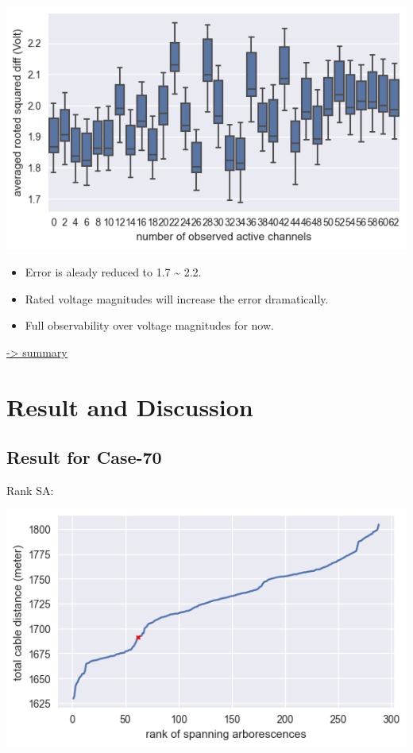 \documentclass[
]{book}
\providecommand{\tightlist}{%
  \setlength{\itemsep}{0pt}\setlength{\parskip}{0pt}}
\begin{document}
\begin{center}\includegraphics{Pictures/figErrorObsBRM} \end{center}

\begin{itemize}
\tightlist
\item
  Error is aleady reduced to 1.7 \textasciitilde{} 2.2.
\item
  Rated voltage magnitudes will increase the error dramatically.
\item
  Full observability over voltage magnitudes for now.
\end{itemize}

\protect\hyperlink{summary}{-\textgreater{} summary}

\hypertarget{result-and-discussion}{%
\chapter{Result and Discussion}\label{result-and-discussion}}

\hypertarget{result-for-case-70}{%
\section{Result for Case-70}\label{result-for-case-70}}

Rank SA:

\begin{center}\includegraphics{Pictures/distances_288} \end{center}
\end{document}
